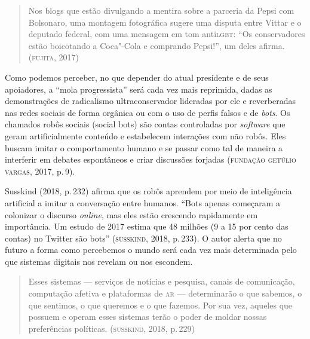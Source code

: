 \begin{quote}
Nos blogs que estão divulgando a mentira sobre a parceria da Pepsi com
Bolsonaro, uma montagem fotográfica sugere uma disputa entre Vittar e o
deputado federal, com uma mensagem em tom anti\textsc{lgbt}: ``Os conservadores
estão boicotando a Coca"-Cola e comprando Pepsi!'', um deles afirma.
(\textsc{fujita}, 2017)
\end{quote}



Como podemos perceber, no que depender do atual presidente e de seus
apoiadores, a ``mola progressista'' será cada vez mais reprimida, dadas
as demonstrações de radicalismo ultraconservador lideradas por ele e
reverberadas nas redes sociais de forma orgânica ou com o uso de perfis
falsos e de \emph{bots}. Os chamados robôs sociais (social bots) são
contas controladas por \emph{software} que geram artificialmente conteúdo e
estabelecem interações com não robôs. Eles buscam imitar o comportamento
humano e se passar como tal de maneira a interferir em debates
espontâneos e criar discussões forjadas (\textsc{fundação getúlio vargas}, 2017,
p.\,9).

Susskind (2018, p.\,232) afirma que os robôs aprendem por meio de
inteligência artificial a imitar a conversação entre humanos. ``Bots
apenas começaram a colonizar o discurso \emph{online}, mas eles estão
crescendo rapidamente em importância. Um estudo de 2017 estima que 48
milhões (9 a 15 por cento das contas) no Twitter são bots'' (\textsc{susskind},
2018, p.\,233). O autor alerta que no futuro a forma como percebemos o
mundo será cada vez mais determinada pelo que sistemas digitais nos
revelam ou nos escondem.

\begin{quote}
Esses sistemas --- serviços de notícias e pesquisa, canais de
comunicação, computação afetiva e plataformas de \textsc{ar} --- determinarão o
que sabemos, o que sentimos, o que queremos e o que fazemos. Por sua
vez, aqueles que possuem e operam esses sistemas terão o poder de moldar
nossas preferências políticas. (\textsc{susskind}, 2018, p.\,229)
\end{quote}

